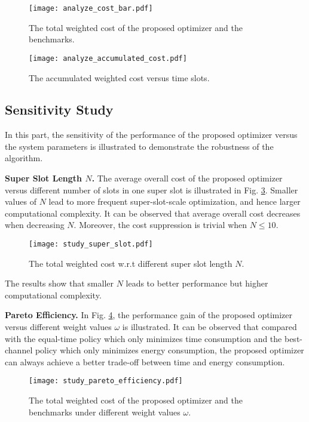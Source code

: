 \begin{figure}
    \centering
    \texttt{[image: analyze\_cost\_bar.pdf]}
    \caption{The total weighted cost of the proposed {\fwName} optimizer and the benchmarks.}
    \label{fig:analyze_total_cost}
\end{figure}

  
\begin{figure}
    \centering
    \texttt{[image: analyze\_accumulated\_cost.pdf]}
    \caption{The accumulated weighted cost versus time slots.}
    \label{fig:analyze_accumulated_cost}
\end{figure}


\subsection{Sensitivity Study}
\label{subsec:sensitivity}

In this part, the sensitivity of the performance of the proposed {\fwName} optimizer versus the system parameters is illustrated to demonstrate the robustness of the algorithm.

\noindent\textbf{Super Slot Length $N$.}
The average overall cost of the proposed {\fwName} optimizer versus different number of slots in one super slot is illustrated in Fig. \ref{fig:study_super_slot}. Smaller values of $N$ lead to more frequent super-slot-scale optimization, and hence larger computational complexity. It can be observed that average overall cost decreases when decreasing $N$. Moreover, the cost suppression is trivial when $N\leq 10$.
\begin{figure}
    \centering
    \texttt{[image: study\_super\_slot.pdf]}
    \caption{The total weighted cost w.r.t different super slot length $N$.}
    \label{fig:study_super_slot}
\end{figure}
The results show that smaller $N$ leads to better performance but higher computational complexity.

\noindent\textbf{Pareto Efficiency.}
In Fig. \ref{fig:study_pareto_efficiency}, the performance gain of the proposed {\fwName} optimizer versus different weight values $\omega$ is illustrated.
It can be observed that compared with the equal-time policy which only minimizes time consumption and the best-channel policy which only minimizes energy consumption, the proposed {\fwName} optimizer can always achieve a better trade-off between time and energy consumption.
\begin{figure}
    \centering
    \texttt{[image: study\_pareto\_efficiency.pdf]}
    \caption{The total weighted cost of the proposed {\fwName} optimizer and the benchmarks under different weight values $\omega$.}
    \label{fig:study_pareto_efficiency}
\end{figure}
